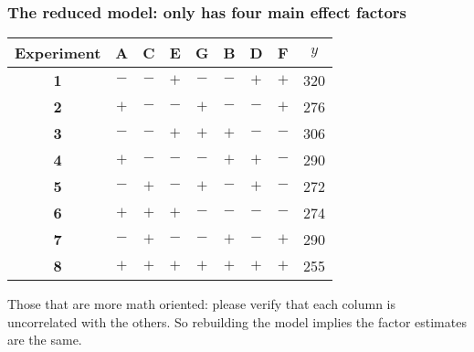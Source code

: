 \documentclass[handout,11pt,aspectratio=169,mathserif]{beamer}
\begin{document}
\begin{frame}\frametitle{The reduced model: only has four main effect factors}
	\renewcommand{\lg}{\color{lightgray}}
	
	\vspace{0.4cm}
	\begin{tabulary}{\linewidth}{c|ccccccc|c}\hline
		\textbf{\relax Experiment} & \textbf{\relax A } & \textbf{\relax C} & \textbf{\relax E } & \textbf{\relax G} & \lg \textbf{\relax B} & \lg \textbf{\relax D} & \lg \textbf{\relax F} & $y$\\ \hline
		\textbf{1} & \(-\) & \(-\) & \(+\) & \(-\) & \lg \(-\) & \lg  \(+\) & \lg  \(+\) & 320\\
		\textbf{2} & \(+\) & \(-\) & \(-\) & \(+\) & \lg \(-\) & \lg  \(-\) & \lg  \(+\) & 276\\
		\textbf{3} & \(-\) & \(-\) & \(+\) & \(+\) & \lg \(+\) & \lg  \(-\) & \lg  \(-\) & 306\\
		\textbf{4} & \(+\) & \(-\) & \(-\) & \(-\) & \lg \(+\) & \lg  \(+\) & \lg  \(-\) & 290\\
		\textbf{5} & \(-\) & \(+\) & \(-\) & \(+\) & \lg \(-\) & \lg  \(+\) & \lg  \(-\) & 272\\
		\textbf{6} & \(+\) & \(+\) & \(+\) & \(-\) & \lg \(-\) & \lg  \(-\) & \lg  \(-\) & 274\\
		\textbf{7} & \(-\) & \(+\) & \(-\) & \(-\) & \lg \(+\) & \lg  \(-\) & \lg  \(+\) & 290\\
		\textbf{8} & \(+\) & \(+\) & \(+\) & \(+\) & \lg \(+\) & \lg  \(+\) & \lg  \(+\) & 255\\ \hline
	\end{tabulary}
	
	\vspace{1cm}
	Those that are more math oriented: please verify that each column is uncorrelated with the others. So rebuilding the model implies the factor estimates are the same.
\end{frame}
\end{document}
